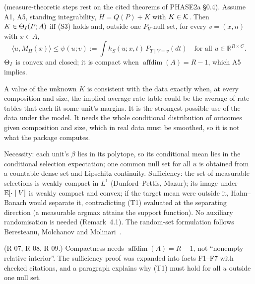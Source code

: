 \begin{result}\label{res:p2a-t1}
 (measure-theoretic steps rest on the cited theorems of PHASE2a
\S0.4). Assume A1, A5, standing integrability, $H=Q(P)+K$ with $K\in\mathcal K$.
Then $K\in\Theta_I(P;A)$ iff (S3) holds and, outside one $P_V$-null set, for every
$v=(x,n)$ with $x\in A$,
\[
\langle u,M_H(x)\rangle\le\psi(u;v):=\int h_S(u;x,t)\,P_{T\mid V=v}(dt)\quad\text{for all }u\in\mathbb R^{R\times C}. \tag{T1}
\]
$\Theta_I$ is convex and closed; it is compact when $\operatorname{affdim}(A)=R-1$,
which A5 implies.
\end{result}
\begin{plain}
A value of the unknown $K$ is consistent with the data exactly when, at every
composition and size, the implied average rate table could be the average of
rate tables that each fit some unit's margins. It is the strongest possible
use of the data under the model. It needs the whole conditional distribution of
outcomes given composition and size, which in real data must be smoothed, so it
is not what the package computes.
\end{plain}
\begin{sketch}
Necessity: each unit's $\beta$ lies in its polytope, so its conditional mean lies
in the conditional selection expectation; one common null set for all $u$ is
obtained from a countable dense set and Lipschitz continuity. Sufficiency: the
set of measurable selections is weakly compact in $L^1$ (Dunford--Pettis,
Mazur); its image under $\mathbb E[\cdot\mid V]$ is weakly compact and convex; if the
target mean were outside it, Hahn--Banach would separate it, contradicting
(T1) evaluated at the separating direction (a measurable argmax attains the
support function). No auxiliary randomisation is needed (Remark~4.1). The random-set formulation follows Beresteanu, Molchanov and Molinari~\citep{bmm2011}.
\end{sketch}
\begin{revnote}
(R-07, R-08, R-09.) Compactness needs $\operatorname{affdim}(A)=R-1$, not
``nonempty relative interior''. The sufficiency proof was expanded into
facts F1--F7 with checked citations, and a paragraph explains why (T1) must hold
for all $u$ outside one null set.
\end{revnote}

